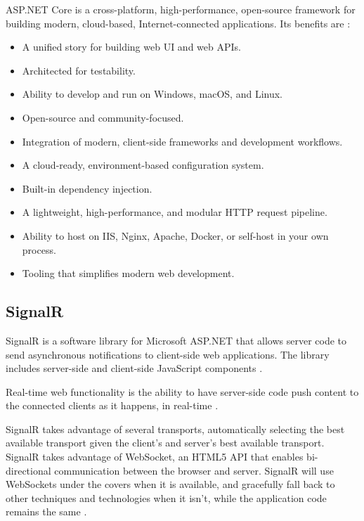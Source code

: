 ASP.NET Core is a cross-platform, high-performance, open-source framework for building modern, cloud-based, Internet-connected applications. Its benefits are \cite{asp-dotnet-core-description}\cite{asp-core-book1}:
\begin{itemize}
	\item A unified story for building web UI and web APIs.
	\item Architected for testability.
	\item Ability to develop and run on Windows, macOS, and Linux.
	\item Open-source and community-focused.
	\item Integration of modern, client-side frameworks and development workflows.
	\item A cloud-ready, environment-based configuration system.
	\item Built-in dependency injection.
	\item A lightweight, high-performance, and modular HTTP request pipeline.
	\item Ability to host on IIS, Nginx, Apache, Docker, or self-host in your own process.
	\item Tooling that simplifies modern web development.
\end{itemize}

\subsection{SignalR}
\label{chap:04:02:02}

SignalR is a software library for Microsoft ASP.NET that allows server code to send asynchronous notifications to client-side web applications. The library includes server-side and client-side JavaScript components \cite{signalR-description}.

Real-time web functionality is the ability to have server-side code push content to the connected clients as it happens, in real-time \cite{signalR-description}.

SignalR takes advantage of several transports, automatically selecting the best available transport given the client's and server's best available transport. SignalR takes advantage of WebSocket, an HTML5 API that enables bi-directional communication between the browser and server. SignalR will use WebSockets under the covers when it is available, and gracefully fall back to other techniques and technologies when it isn't, while the application code remains the same \cite{signalR-description}.

